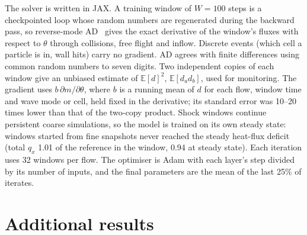 \documentclass[10pt]{article}
\begin{document}
The solver is written in JAX. A training window of $W=100$ steps is a checkpointed loop whose
random numbers are regenerated during the backward pass, so reverse-mode AD~\citep{griewank2008}
gives the exact derivative of the window's fluxes with respect to $\theta$ through collisions,
free flight and inflow. Discrete events (which cell a particle is in, wall hits) carry no
gradient. AD agrees with finite differences using common random numbers to seven digits. Two
independent copies of each window give an unbiased estimate of $\mathbb E[d]^2$,
$\mathbb E[d_ad_b]$, used for monitoring. The gradient uses
$b\,\partial m/\partial\theta$, where $b$ is a running mean of $d$ for each flow, window time and
wave mode or cell, held fixed in the derivative; its standard error was 10--20 times lower than
that of the two-copy product. Shock windows continue persistent coarse simulations, so the model
is trained on its own steady state: windows started from fine snapshots never reached the
steady heat-flux deficit (total $q_x$ 1.01 of the reference in the window, 0.94 at steady state).
Each iteration uses 32 windows per flow. The optimiser is Adam with each layer's step divided by
its number of inputs, and the final parameters are the mean of the last 25\% of iterates.

\section{Additional results}\label{app:extra}

\begin{table}[H]
\centering\small
\caption{The nine network settings: error relative to the base on the training flows (networks
trained on all five) and on the left-out flow (mean over LOCO folds $\pm$ standard error),
measured with the shorter validation runs (uncorrected operator: 1.17).}
\label{tab:sweep}

\end{table}

\begin{table}[H]
\centering\small
\caption{Mach 10 argon cylinder at Knudsen number 0.04, wall at half the stagnation temperature:
drag and heat load relative to a fine NTC simulation ($\pm$ standard error) with every cell
$2\lambda$ or $4\lambda$ wide. The learned operator runs in every cell, including the cold layer
next to the wall, which is outside its training range. With $2\lambda$ cells, every
Fokker--Planck-based operator predicts the heat load far better than NTC (+15\%); the learned
corrections are within about two standard errors of their base.}
\label{tab:circle}

\end{table}
\end{document}
